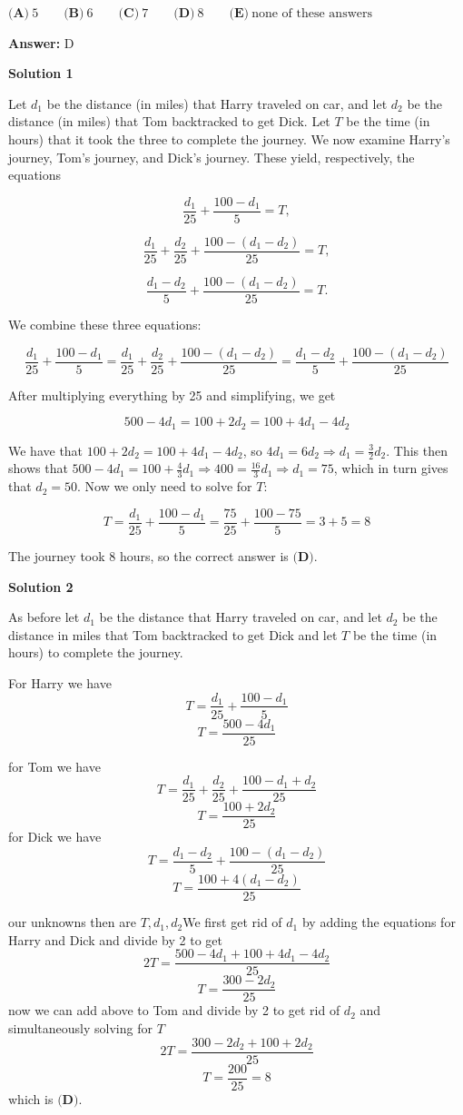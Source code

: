 \begin{enumerate}
 $\textbf{(A)}\ 5\qquad\textbf{(B)}\ 6\qquad\textbf{(C)}\ 7\qquad\textbf{(D)}\ 8\qquad\textbf{(E)}\ \text{none of these answers}$

 \textbf{Answer: }D



\textbf{Solution 1}

Let $d_1$ be the distance (in miles) that Harry traveled on car, and let $d_2$ be the distance (in miles) that Tom backtracked to get Dick. Let $T$ be the time (in hours) that it took the three to complete the journey. We now examine Harry's journey, Tom's journey, and Dick's journey. These yield, respectively, the equations

 
 \[\frac{d_1}{25}+\frac{100-d_1}{5}=T,\]

 \[\frac{d_1}{25}+\frac{d_2}{25}+\frac{100-(d_1-d_2)}{25}=T,\]

 \[\frac{d_1-d_2}{5}+\frac{100-(d_1-d_2)}{25}=T.\]

 We combine these three equations:

 
 \[\frac{d_1}{25}+\frac{100-d_1}{5}=\frac{d_1}{25}+\frac{d_2}{25}+\frac{100-(d_1-d_2)}{25}=\frac{d_1-d_2}{5}+\frac{100-(d_1-d_2)}{25}\]

 After multiplying everything by 25 and simplifying, we get

 
 \[500-4d_1=100+2d_2=100+4d_1-4d_2\]

 We have that $100+2d_2=100+4d_1-4d_2$, so $4d_1=6d_2\Rightarrow d_1=\frac{3}{2}d_2$. This then shows that $500-4d_1=100+\frac{4}{3}d_1\Rightarrow 400=\frac{16}{3}d_1\Rightarrow d_1=75$, which in turn gives that $d_2=50$. Now we only need to solve for $T$:

 
 \[T=\frac{d_1}{25}+\frac{100-d_1}{5}=\frac{75}{25}+\frac{100-75}{5}=3+5=8\]

 The journey took 8 hours, so the correct answer is $\boxed{\textbf{(D)}}$.

 



\textbf{Solution 2}

As before let $d_1$ be the distance that Harry traveled on car, and let $d_2$ be the distance in miles that Tom backtracked to get Dick and let $T$ be the time (in hours) to complete the journey.  

 For Harry we have
 \[T=\frac{d_1}{25} + \frac{100-d_1}{5}\]
 \[T=\frac{500-4d_1}{25}\]

 for Tom we have
 \[T=\frac{d_1}{25}+\frac{d_2}{25}+ \frac{100-d_1+d_2}{25}\]
 \[T=\frac{100+2d_2}{25}\]for Dick we have
 \[T=\frac{d_1-d_2}{5}+\frac{100-(d_1-d_2)}{25}\]
 \[T=\frac{100+4(d_1-d_2)}{25}\]

 our unknowns then are $T,d_1,d_2$We first get rid of $d_1$ by adding the equations for Harry and Dick and divide by 2 to get 
 \[2T=\frac{500-4d_1+100+4d_1-4d_2}{25}\]
 \[T=\frac{300-2d_2}{25}\]now we can add above to Tom and divide by 2 to get rid of $d_2$ and simultaneously solving for $T$
 \[2T=\frac{300-2d_2+100+2d_2}{25}\]
 \[T=\frac{200}{25}=8\]which is $\boxed{\textbf{(D)}}$.

 


\end{enumerate}